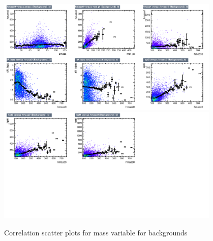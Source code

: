 \begin{figure}[!htb]%
\centering
\includegraphics[width=0.95\textwidth]{figures/CRDY/dataset/plots/correlationscatter_hmass0__Id_c3.pdf}
\includegraphics[width=0.95\textwidth]{figures/CRDY/dataset/plots/correlationscatter_hmass0__Id_c4.pdf}
\caption{ Correlation scatter plots for \HZZ mass variable for backgrounds}%
\label{fig:correlations_CRDY_hmass0_BG}                                                       
\end{figure}




